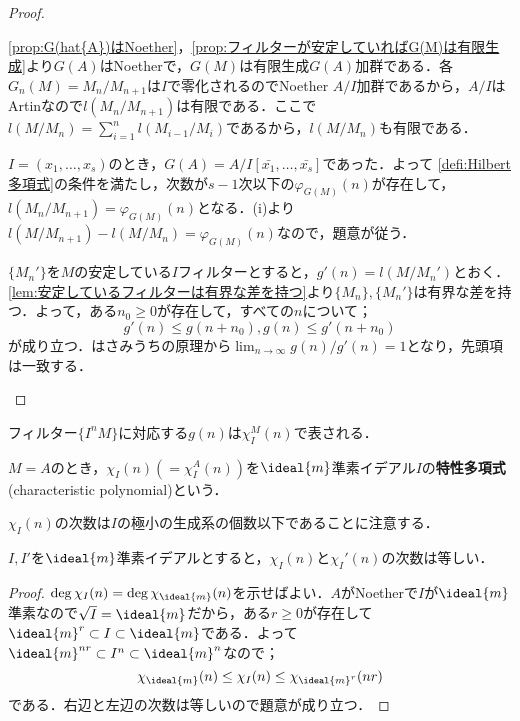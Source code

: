 \begin{proof}
	\begin{sakura}
		\item \ref{prop:G(hat{A})はNoether}，\ref{prop:フィルターが安定していればG(M)は有限生成}より$G(A)$はNoetherで，$G(M)$は有限生成$G(A)$加群である．各$G_n(M)=M_n/M_{n+1}$は$I$で零化されるのでNoether $A/I$加群であるから，$A/I$はArtinなので$l(M_n/M_{n+1})$は有限である．ここで$l(M/M_n)=\sum_{i=1}^n l(M_{i-1}/M_i)$であるから，$l(M/M_n)$も有限である．
		\item $I=(x_1,\dots,x_s)$のとき，$G(A)=A/I[\bar{x_1},\dots,\bar{x_s}]$であった．よって \ref{defi:Hilbert多項式}の条件を満たし，次数が$s-1$次以下の$\varphi_{G(M)}(n)$が存在して，$l(M_n/M_{n+1})=\varphi_{G(M)}(n)$となる．(i)より$l(M/M_{n+1})-l(M/M_n)=\varphi_{G(M)}(n)$なので，題意が従う．
		\item $\{M_n'\}$を$M$の安定している$I$フィルターとすると，$g'(n)=l(M/M_n')$とおく．\ref{lem:安定しているフィルターは有界な差を持つ}より$\{M_n\},\{M_n'\}$は有界な差を持つ．よって，ある$n_0\geq0$が存在して，すべての$n$について；
		\[g'(n)\leq g(n+n_0),g(n)\leq g'(n+n_0)\]
		が成り立つ．はさみうちの原理から$\lim_{n\to\infty} g(n)/g'(n)=1$となり，先頭項は一致する．
	\end{sakura}
\end{proof}

フィルター$\{I^n M\}$に対応する$g(n)$は$\chi_I^M(n)$で表される．

\begin{defi}[特性多項式]
	$M=A$のとき，$\chi_I(n)(=\chi_I^A(n))$を$\ideal{m}$準素イデアル$I$の\textbf{特性多項式}(characteristic polynomial)という．
\end{defi}

$\chi_I(n)$の次数は$I$の極小の生成系の個数以下であることに注意する．

\begin{prop}
	$I,I'$を$\ideal{m}$準素イデアルとすると，$\chi_I(n)$と$\chi_I'(n)$の次数は等しい．
\end{prop}

\begin{proof}
	$\deg\chi_I(n)=\deg\chi_{\ideal{m}}(n)$を示せばよい．$A$がNoetherで$I$が$\ideal{m}$準素なので$\sqrt{I}=\ideal{m}$だから，ある$r\geq0$が存在して$\ideal{m}^r\subset I\subset\ideal{m}$である．よって$\ideal{m}^{nr}\subset I^n\subset\ideal{m}^n$なので；
	\[\chi_{\ideal{m}}(n)\leq\chi_I(n)\leq\chi_{\ideal{m}^r}(nr)\]
	である．右辺と左辺の次数は等しいので題意が成り立つ．
\end{proof}

